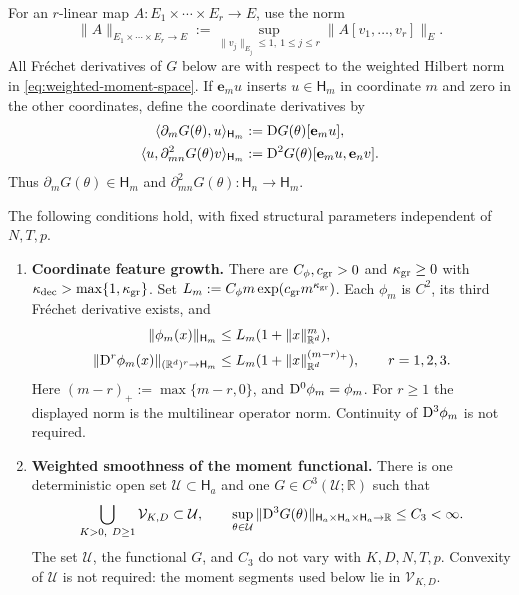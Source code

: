 For an $r$-linear map $A:E_1\times\cdots\times E_r\to E$, use the norm
\[
 \|A\|_{E_1\times\cdots\times E_r\to E}
 :=\sup_{\|v_j\|_{E_j}\le1,\ 1\le j\le r}
                  \|A[v_1,\ldots,v_r]\|_E.
\]
All Fr\'echet derivatives of $G$ below are with respect to the
weighted Hilbert norm in \eqref{eq:weighted-moment-space}.
If $\mathbf e_m u$ inserts $u\in\mathsf H_m$ in coordinate $m$ and
zero in the other coordinates, define the coordinate derivatives by
\begin{equation}
\label{eq:moment-coordinate-derivatives}
\begin{aligned}
 \langle\partial_mG(\theta),u\rangle_{\mathsf H_m}
   &:=\mathrm{D} G(\theta)[\mathbf e_m u],\\
 \langle u,\partial_{mn}^2G(\theta)v\rangle_{\mathsf H_m}
   &:=\mathrm{D}^2G(\theta)[\mathbf e_m u,\mathbf e_n v].
\end{aligned}
\end{equation}
Thus $\partial_mG(\theta)\in\mathsf H_m$ and
$\partial_{mn}^2G(\theta):\mathsf H_n\to\mathsf H_m$.

\begin{assumption}
\label{assumption-structured-moment-smoothness}
The following conditions hold, with fixed structural parameters
independent of $N,T,p$.
\begin{enumerate}[label=(\roman*),leftmargin=*]
\item \textbf{Coordinate feature growth.}
There are $C_\phi,c_{\rm gr}>0$ and $\kappa_{\rm gr}\ge0$ with
$\kappa_{\rm dec}>\max\{1,\kappa_{\rm gr}\}$. Set
$L_m:=C_\phi m\exp(c_{\rm gr}m^{\kappa_{\rm gr}})$.
Each $\phi_m$ is $C^2$, its third Fr\'echet derivative exists, and
\begin{equation}
\label{eq:coordinate-feature-growth}
\begin{aligned}
 \|\phi_m(x)\|_{\mathsf H_m}&\le L_m(1+\|x\|_{\mathbb R^d}^m),\\
 \|\mathrm{D}^r\phi_m(x)\|_{(\mathbb R^d)^r\to\mathsf H_m}
 &\le L_m(1+\|x\|_{\mathbb R^d}^{(m-r)_+}),\qquad r=1,2,3.
\end{aligned}
\end{equation}
Here $(m-r)_+:=\max\{m-r,0\}$, and $\mathrm{D}^0\phi_m=\phi_m$.
For $r\ge1$ the displayed norm is the multilinear operator norm.
Continuity of $\mathrm{D}^3\phi_m$ is not required.
\item \textbf{Weighted smoothness of the moment functional.}
There is one deterministic open set $\mathcal U\subset\mathsf H_a$
and one $G\in C^3(\mathcal U;\mathbb R)$ such that
\begin{equation}
\label{eq:structured-moment-open-neighbourhood}
 \bigcup_{K>0,\ D\ge1}\mathcal V_{K,D}\subset\mathcal U,\qquad
 \sup_{\theta\in\mathcal U}
 \|\mathrm{D}^3G(\theta)\|_{\mathsf H_a\times\mathsf H_a\times\mathsf H_a\to\mathbb R}
 \le C_3<\infty.
\end{equation}
The set $\mathcal U$, the functional $G$, and $C_3$ do not vary with
$K,D,N,T,p$. Convexity of $\mathcal U$ is not required:
the moment segments used below lie in $\mathcal V_{K,D}$.
\end{enumerate}
\end{assumption}

